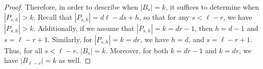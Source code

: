 \documentclass[10pt,a4paper]{amsart}
\begin{document}
\begin{proof}
Therefore, in order to describe when $|B_s|=k$, it suffices to determine when $|P_{s,h}|>k$. Recall that $|P_{s,h}| = d\ell-ds+h$, so that for any $s<\ell-r$, we have $|P_{s,h}|>k$. Additionally, if we assume that $|P_{s,h}|=k=dr-1$, then $h=d-1$ and $s=\ell-r+1$. Similarly, for $|P_{s,h}|=k=dr$, we have $h=d$, and $s = \ell-r+1$.
Thus, for all $s < \ell-r$, $|B_s| = k$. Moreover, for both $k=dr-1 $ and $k=dr$, we have $|B_{\ell-r}| = k$ as well. 
\end{proof}
\end{document}
